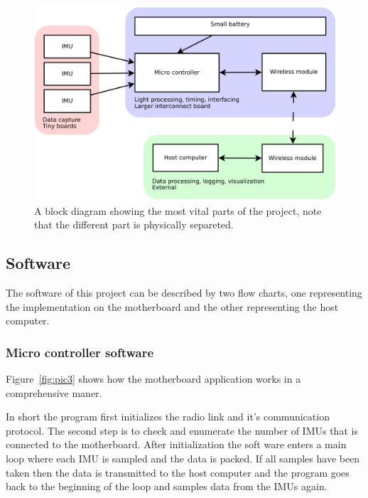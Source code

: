 \documentclass[a4paper, 12pt]{article}
\begin{document}
\begin{figure}[h!]
    \centering
    \includegraphics[scale=0.38]{block.pdf}
    \caption{A block diagram showing the most vital parts of the project, note that the different part is physically separeted.}
    \label{fig:pic2}
\end{figure}

\newpage
\subsection*{Software}
The software of this project can be described by two flow charts, one representing the implementation on the motherboard and the other representing the host computer.

\subsubsection*{Micro controller software}
Figure~\ref{fig:pic3} shows how the motherboard application works in a comprehensive maner. 

In short the program first initializes the radio link and it's communication protocol. The second step is to check and enumerate the number of IMUs that is connected to the motherboard. After initialization the soft ware enters a main loop where each IMU is sampled and the data is packed. If all samples have been taken then the data is transmitted to the host computer and the program goes back to the beginning of the loop and samples data from the IMUs again.    
\end{document}
